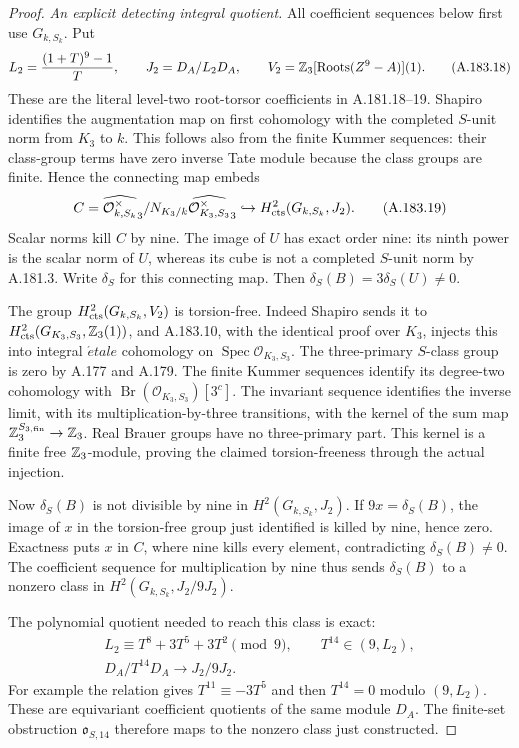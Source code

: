 \begin{proof}
\emph{An explicit detecting integral quotient.}
All coefficient sequences below first use \(G_{k,S_k}\).
Put
\[
 L_2=\frac{(1+T)^9-1}{T},\qquad
 J_2=D_A/L_2D_A,\qquad
 V_2=\mathbb Z_3[\operatorname{Roots}(Z^9-A)](1).
\tag{A.183.18}
\]
These are the literal level-two root-torsor coefficients in
A.181.18--19.  Shapiro identifies the augmentation map on
first cohomology with the completed \(S\)-unit norm from
\(K_3\) to \(k\).  This follows also from the finite Kummer
sequences: their class-group terms have zero inverse Tate
module because the class groups are finite.  Hence the
connecting map embeds
\[
 C=\widehat{\mathcal O_{k,S_k}^{\times}}_3/
       N_{K_3/k}\widehat{\mathcal O_{K_3,S_3}^{\times}}_3
       \hookrightarrow
 H^2_{\rm cts}(G_{k,S_k},J_2).
\tag{A.183.19}
\]
Scalar norms kill \(C\) by nine.  The image of \(U\) has
exact order nine: its ninth power is the scalar norm of
\(U\), whereas its cube is not a completed \(S\)-unit norm
by A.181.3.  Write \(\delta_S\) for this connecting map.
Then \(\delta_S(B)=3\delta_S(U)\ne0\).

The group \(H^2_{\rm cts}(G_{k,S_k},V_2)\) is torsion-free.
Indeed Shapiro sends it to
\(H^2_{\rm cts}(G_{K_3,S_3},\mathbb Z_3(1))\), and A.183.10,
with the identical proof over \(K_3\), injects this into
integral \(\acute etale\) cohomology on
\(\operatorname{Spec}\mathcal O_{K_3,S_3}\).
The three-primary \(S\)-class group is zero by A.177 and
A.179.  The finite Kummer sequences identify its degree-two
cohomology with \(\operatorname{Br}(\mathcal O_{K_3,S_3})[3^c]\).
The invariant sequence identifies the inverse limit, with
its multiplication-by-three transitions, with the kernel
of the sum map \(\mathbb Z_3^{S_{3,\mathrm{fin}}}\to\mathbb Z_3\).
Real Brauer groups have no three-primary part.
This kernel is a finite free \(\mathbb Z_3\)-module, proving the
claimed torsion-freeness through the actual injection.

Now \(\delta_S(B)\) is not divisible by nine in
\(H^2(G_{k,S_k},J_2)\).  If \(9x=\delta_S(B)\), the image
of \(x\) in the torsion-free group just identified is killed
by nine, hence zero.  Exactness puts \(x\) in \(C\), where
nine kills every element, contradicting \(\delta_S(B)\ne0\).
The coefficient sequence for multiplication by nine thus
sends \(\delta_S(B)\) to a nonzero class in
\(H^2(G_{k,S_k},J_2/9J_2)\).

The polynomial quotient needed to reach this class is exact:
\[
 \begin{gathered}
 L_2\equiv T^8+3T^5+3T^2\pmod9,\qquad
 T^{14}\in(9,L_2),\\
 D_A/T^{14}D_A\longrightarrow J_2/9J_2.
 \end{gathered}
\tag{A.183.20}
\]
For example the relation gives
\(T^{11}\equiv-3T^5\) and then \(T^{14}=0\) modulo
\((9,L_2)\).  These are equivariant coefficient quotients
of the same module \(D_A\).  The finite-set obstruction
\(\mathfrak o_{S,14}\) therefore maps to the nonzero class
just constructed.


\end{proof}
